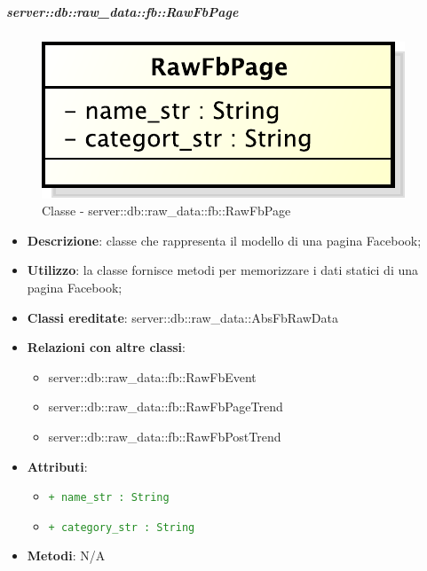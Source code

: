 			\subparagraph{server::db::raw\_data::fb::RawFbPage} %
			\label{subp:server_db_raw_data_fb_rawfbpage}
				\begin{figure}[htbp]
					\centering
					\centerline{\includegraphics[scale=0.75]{./images/server/classes/db/raw_fb_page.pdf}}
					\caption{Classe - server::db::raw\_data::fb::RawFbPage}
				\end{figure}
				\begin{itemize}
					\item \textbf{Descrizione}: classe che rappresenta il modello di una pagina Facebook;
					\item \textbf{Utilizzo}: la classe fornisce metodi per memorizzare i dati statici di una pagina Facebook;
					\item \textbf{Classi ereditate}: server::db::raw\_data::AbsFbRawData
					\item \textbf{Relazioni con altre classi}:
						\begin{itemize}
							\item server::db::raw\_data::fb::RawFbEvent
							\item server::db::raw\_data::fb::RawFbPageTrend
							\item server::db::raw\_data::fb::RawFbPostTrend
						\end{itemize}
					\item \textbf{Attributi}:
					\begin{itemize}
						\item \textcolor{forestgreen}{\texttt{+ name\_str : String}}
						\item \textcolor{forestgreen}{\texttt{+ category\_str : String}}
					\end{itemize}
					\item \textbf{Metodi}: N/A
				\end{itemize}

